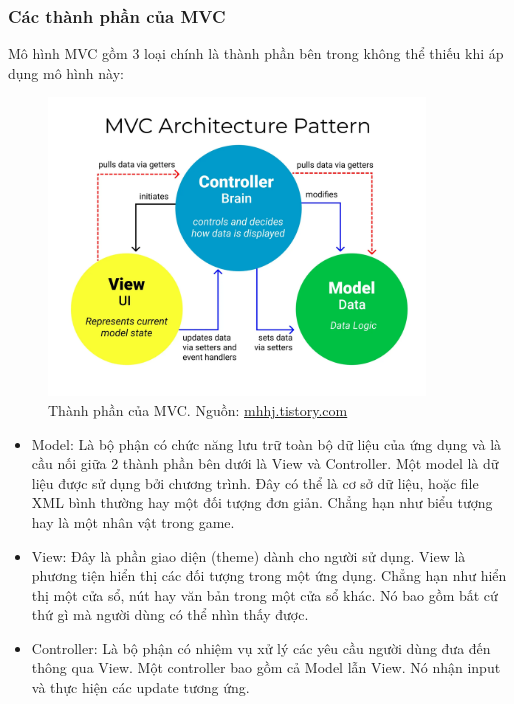 \subsubsection{Các thành phần của MVC}
Mô hình MVC gồm 3 loại chính là thành phần bên trong không thể thiếu khi áp dụng mô hình này:
\begin{figure}[H]
	\centering
	\includegraphics[width=10cm]{Images/cacthanhphanmvc.png}
	\vspace{0.5cm}
	\caption{Thành phần của MVC. Nguồn: \href{https://mhhj.tistory.com/m/95}{mhhj.tistory.com}}
	\label{fig:my_label}
\end{figure}

\begin{itemize}
	\item Model: Là bộ phận có chức năng lưu trữ toàn bộ dữ liệu của ứng dụng và là cầu nối giữa 2 thành phần bên dưới là View và Controller. Một model là dữ liệu được sử dụng bởi chương trình. Đây có thể là cơ sở dữ liệu, hoặc file XML bình thường hay một đối tượng đơn giản. Chẳng hạn như biểu tượng hay là một nhân vật trong game.
	\item View: Đây là phần giao diện (theme) dành cho người sử dụng. View là phương tiện hiển thị các đối tượng trong một ứng dụng. Chẳng hạn như hiển thị một cửa sổ, nút hay văn bản trong một cửa sổ khác. Nó bao gồm bất cứ thứ gì mà người dùng có thể nhìn thấy được.
	\item Controller: Là bộ phận có nhiệm vụ xử lý các yêu cầu người dùng đưa đến thông qua View. Một controller bao gồm cả Model lẫn View. Nó nhận input và thực hiện các update tương ứng.
\end{itemize}

